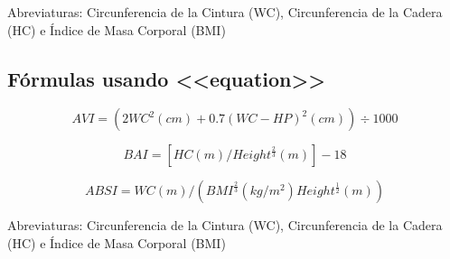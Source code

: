 \documentclass[a4paper,11pt]{article}
\begin{document}
Abreviaturas: Circunferencia de la Cintura (WC), Circunferencia de la Cadera (HC) e Índice de Masa Corporal (BMI)
		
\subsection{Fórmulas usando <<equation>>}
 \begin{equation}
	AVI = (2WC^{2}(cm)+ 0.7 (WC-HP)^{2}(cm))\div 1000
 \end{equation}
		
 \begin{equation}
	BAI = [HC(m)/Height^{\frac{2}{3}}(m)]-18
 \end{equation}
		
 \begin{equation}
    ABSI = WC(m)/(BMI^{\frac{2}{3}}(kg/m^{2})Height^{\frac{1}{2}}(m))
 \end{equation}
		
Abreviaturas: Circunferencia de la Cintura (WC), Circunferencia de la Cadera (HC) e Índice de Masa Corporal (BMI)
		
	
	
	\nocite{*}
		
\end{document}
